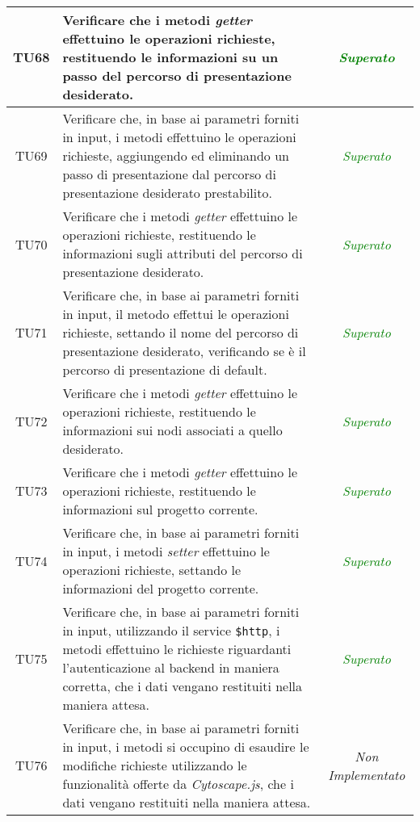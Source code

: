 \begin{longtable}{|c|>{}m{8cm}|c|}
\hypertarget{TU68}{TU68} & Verificare che i metodi \textit{getter} effettuino le operazioni richieste, restituendo le informazioni su un passo del percorso di presentazione desiderato\finaleTestUnita{}. & \textcolor{Green}{\textit{Superato}}\\ \hline
\hypertarget{TU69}{TU69} & Verificare che, in base ai parametri forniti in input, i metodi effettuino le operazioni richieste, aggiungendo ed eliminando un passo di presentazione dal percorso di presentazione desiderato prestabilito\finaleTestUnita{}. & \textcolor{Green}{\textit{Superato}}\\ \hline
\hypertarget{TU70}{TU70} & Verificare che i metodi \textit{getter} effettuino le operazioni richieste, restituendo le informazioni sugli attributi del percorso di presentazione desiderato\finaleTestUnita{}. & \textcolor{Green}{\textit{Superato}}\\ \hline
\hypertarget{TU71}{TU71} & Verificare che, in base ai parametri forniti in input, il metodo effettui le operazioni richieste, settando il nome del percorso di presentazione desiderato, verificando se è il percorso di presentazione di default\finaleTestUnita{}. & \textcolor{Green}{\textit{Superato}}\\ \hline
\hypertarget{TU72}{TU72} & Verificare che i metodi \textit{getter} effettuino le operazioni richieste, restituendo le informazioni sui nodi associati a quello desiderato\finaleTestUnita{}. & \textcolor{Green}{\textit{Superato}}\\ \hline
\hypertarget{TU73}{TU73} & Verificare che i metodi \textit{getter} effettuino le operazioni richieste, restituendo le informazioni sul progetto corrente\finaleTestUnita{}. & \textcolor{Green}{\textit{Superato}}\\ \hline
\hypertarget{TU74}{TU74} & Verificare che, in base ai parametri forniti in input, i metodi \textit{setter} effettuino le operazioni richieste, settando le informazioni del progetto corrente\finaleTestUnita{}. & \textcolor{Green}{\textit{Superato}}\\ \hline
\hypertarget{TU75}{TU75} & Verificare che, in base ai parametri forniti in input, utilizzando il service \texttt{\$http}, i metodi effettuino le richieste riguardanti l’autenticazione al backend in maniera corretta, che i dati vengano restituiti nella maniera attesa\finaleTestUnita{}. & \textcolor{Green}{\textit{Superato}}\\ \hline
\hypertarget{TU76}{TU76} & Verificare che, in base ai parametri forniti in input, i metodi si occupino di esaudire le modifiche richieste utilizzando le funzionalità offerte da \textit{Cytoscape.js}, che i dati vengano restituiti nella maniera attesa\finaleTestUnita{}. & \textit{Non Implementato}\\ \hline

\end{longtable}
